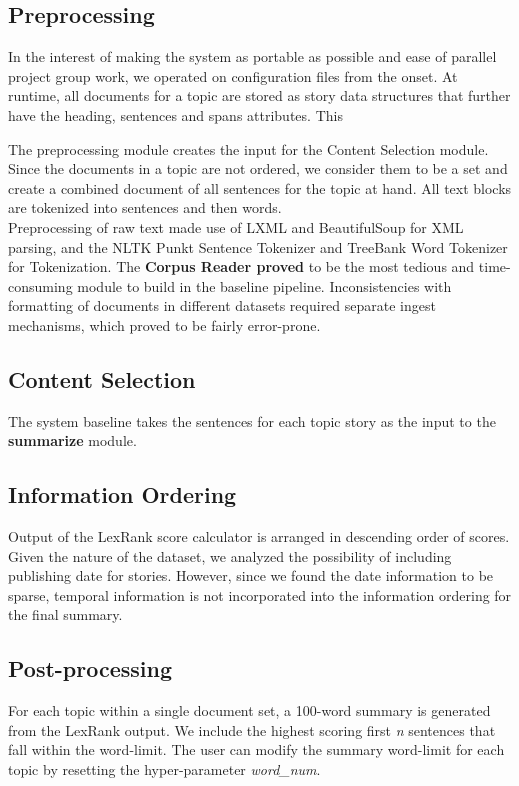 \documentclass[11pt]{article}
\begin{document}
\subsection{Preprocessing}


In the interest of making the system as portable as possible and ease of parallel project group work, we operated on configuration files from the onset.  At runtime, all documents for a topic are stored as story data structures that further have the heading, sentences and spans attributes. This 

The preprocessing module creates the input for the Content Selection module. Since the documents in a topic are not ordered, we consider them to be a set and create a combined document of all sentences for the topic at hand. All text blocks are tokenized into sentences and then words.\\
Preprocessing of raw text made use of LXML and BeautifulSoup for XML parsing, and the NLTK Punkt Sentence Tokenizer and TreeBank Word Tokenizer for Tokenization. 
The \textbf{Corpus Reader proved} to be the most tedious and time-consuming module to build in the baseline pipeline. Inconsistencies with formatting of documents in different datasets required separate ingest mechanisms, which proved to be fairly error-prone. 

\subsection{Content Selection}
The system baseline takes the sentences for each topic story as the input to the \textbf{summarize} module. 

\subsection{Information Ordering} 
Output of the LexRank score calculator is arranged in descending order of scores. Given the nature of the dataset, we analyzed the possibility of including publishing date for stories. However, since we found the date information to be sparse, temporal information is not incorporated into the information ordering for the final summary.


\subsection{Post-processing}
For each topic within a single document set, a 100-word summary is generated from the LexRank output. We include the highest scoring first \textit{n} sentences that fall within the word-limit. The user can modify the summary word-limit for each topic by resetting the hyper-parameter \textit{word\_num}. 
\end{document}
